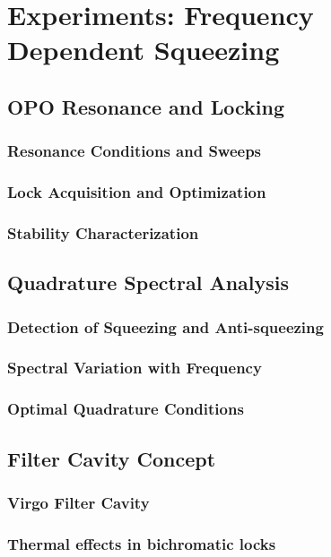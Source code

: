 

\chapter{Experiments: Frequency Dependent Squeezing}%
\label{chap:MATE_cavity}

\section{OPO Resonance and Locking}
\subsection{Resonance Conditions and Sweeps}
\subsection{Lock Acquisition and Optimization}
\subsection{Stability Characterization}
\hspace{1pt}
\section{Quadrature Spectral Analysis}
\subsection{Detection of Squeezing and Anti-squeezing}
\subsection{Spectral Variation with Frequency}
\subsection{Optimal Quadrature Conditions}
\hspace{1pt}
\section{Filter Cavity Concept}
\subsection{Virgo Filter Cavity }
\subsection{Thermal effects in bichromatic locks}